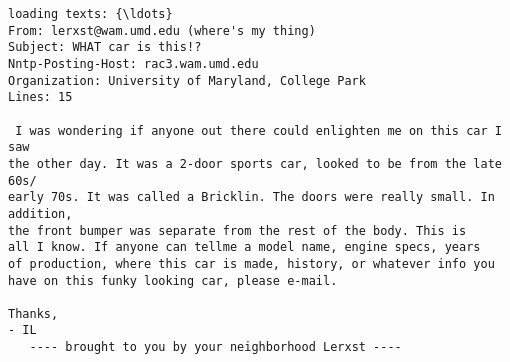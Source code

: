 \documentclass[11pt]{article}
\begin{document}
    \begin{Verbatim}[commandchars=\\\{\}]
loading texts: {\ldots}
From: lerxst@wam.umd.edu (where's my thing)
Subject: WHAT car is this!?
Nntp-Posting-Host: rac3.wam.umd.edu
Organization: University of Maryland, College Park
Lines: 15

 I was wondering if anyone out there could enlighten me on this car I saw
the other day. It was a 2-door sports car, looked to be from the late 60s/
early 70s. It was called a Bricklin. The doors were really small. In addition,
the front bumper was separate from the rest of the body. This is
all I know. If anyone can tellme a model name, engine specs, years
of production, where this car is made, history, or whatever info you
have on this funky looking car, please e-mail.

Thanks,
- IL
   ---- brought to you by your neighborhood Lerxst ----






\end{Verbatim}
\end{document}
